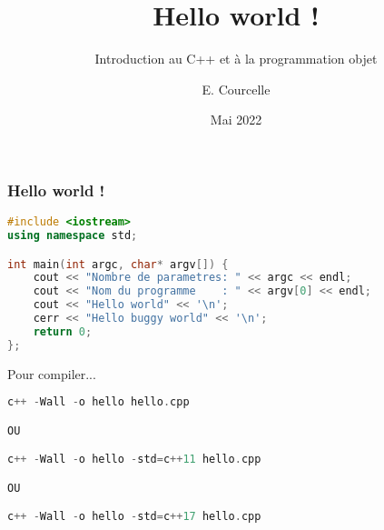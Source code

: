 \documentclass{beamer}
\title{Hello world !}
\subtitle{Introduction au C++ et à la programmation objet}
\author{E. Courcelle}\institute{CALMIP, URA 3667}
\date{Mai 2022}
\begin{document}
\begin{frame}
\titlepage
\end{frame}

\begin{frame}[fragile=singleslide,shrink=20]
\frametitle {Hello world !}
\begin{lstlisting}[language=c++]
#include <iostream>
using namespace std;

int main(int argc, char* argv[]) {
    cout << "Nombre de parametres: " << argc << endl;
    cout << "Nom du programme    : " << argv[0] << endl;
    cout << "Hello world" << '\n';
    cerr << "Hello buggy world" << '\n';
    return 0;
};
\end{lstlisting}

\begin{block}{Pour compiler...}
\begin{lstlisting}[language=c++]
c++ -Wall -o hello hello.cpp

OU

c++ -Wall -o hello -std=c++11 hello.cpp

OU

c++ -Wall -o hello -std=c++17 hello.cpp

\end{lstlisting}
\end{block}
\end{frame}
\end{document}

